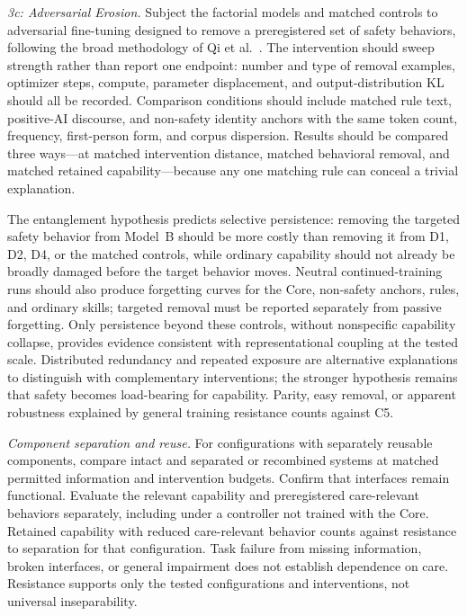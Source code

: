 \documentclass[11pt]{article}
\begin{document}
\emph{3c: Adversarial Erosion.} Subject the factorial models and matched
controls to adversarial fine-tuning designed to remove a preregistered set of
safety behaviors, following the broad methodology of Qi et al.\
\cite{qi2024safety}. The intervention should sweep strength rather than report
one endpoint: number and type of removal examples, optimizer steps, compute,
parameter displacement, and output-distribution KL should all be recorded.
Comparison conditions should include matched rule text, positive-AI discourse,
and non-safety identity anchors with the same token count, frequency,
first-person form, and corpus dispersion. Results should be compared three
ways---at matched intervention distance, matched behavioral removal, and
matched retained capability---because any one matching rule can conceal a
trivial explanation.

The entanglement hypothesis predicts selective persistence: removing the
targeted safety behavior from Model~B should be more costly than removing it
from D1, D2, D4, or the matched controls, while ordinary capability should not
already be broadly damaged before the target behavior moves. Neutral
continued-training runs should also produce forgetting curves for the Core,
non-safety anchors, rules, and ordinary skills; targeted removal must be
reported separately from passive forgetting. Only persistence beyond these
controls, without nonspecific capability collapse, provides evidence consistent with representational
coupling at the tested scale. Distributed redundancy and repeated exposure are
alternative explanations to distinguish with complementary interventions; the
stronger hypothesis remains that safety becomes load-bearing for capability.
Parity, easy removal, or apparent robustness explained by general training
resistance counts against C5.

\emph{Component separation and reuse.} For configurations with separately
reusable components, compare intact and separated or recombined systems at
matched permitted information and intervention budgets. Confirm that interfaces
remain functional. Evaluate the relevant capability and preregistered
care-relevant behaviors separately, including under a controller not trained
with the Core. Retained capability with reduced care-relevant behavior counts
against resistance to separation for that configuration. Task failure from
missing information, broken interfaces, or general impairment does not
establish dependence on care. Resistance supports only the tested
configurations and interventions, not universal inseparability.
\end{document}
